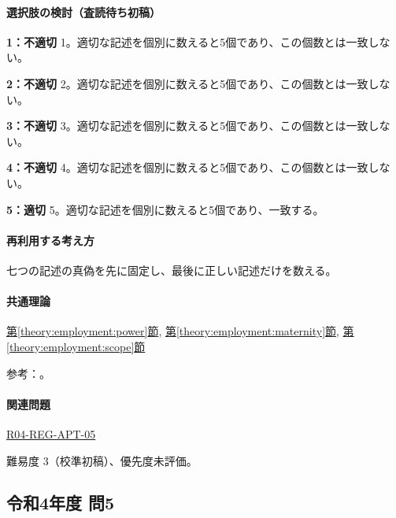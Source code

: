 \paragraph{選択肢の検討（査読待ち初稿）}\mbox{}\par

\noindent\textbf{1：不適切} 1。適切な記述を個別に数えると5個であり、この個数とは一致しない。\par

\noindent\textbf{2：不適切} 2。適切な記述を個別に数えると5個であり、この個数とは一致しない。\par

\noindent\textbf{3：不適切} 3。適切な記述を個別に数えると5個であり、この個数とは一致しない。\par

\noindent\textbf{4：不適切} 4。適切な記述を個別に数えると5個であり、この個数とは一致しない。\par

\noindent\textbf{5：適切} 5。適切な記述を個別に数えると5個であり、一致する。\par

\paragraph{再利用する考え方} 七つの記述の真偽を先に固定し、最後に正しい記述だけを数える。

\paragraph{共通理論} \hyperref[theory:employment:power]{第\ref*{theory:employment:power}節}, \hyperref[theory:employment:maternity]{第\ref*{theory:employment:maternity}節}, \hyperref[theory:employment:scope]{第\ref*{theory:employment:scope}節}

\par 参考：\cite{employment_power2012,employment_power_current,employment_sexual_current,employment_sexual2018,employment_sexual2018}。

\paragraph{関連問題} \hyperref[q:r04-reg-apt-05]{R04-REG-APT-05}

\par 難易度 3（校準初稿）、優先度未評価。

\subsection{令和4年度 問5}
\label{q:r04-reg-apt-05}


